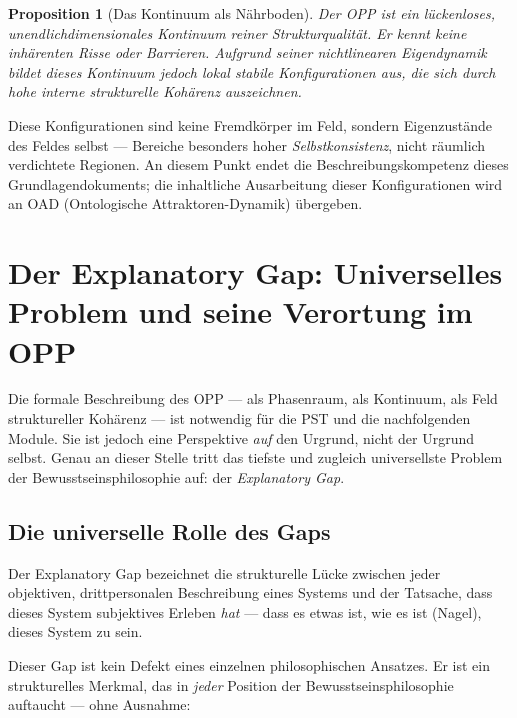 \documentclass[11pt,a4paper]{article}
\theoremstyle{plain}
\newtheorem{proposition}{Proposition}[section]
\theoremstyle{definition}
\begin{document}
\begin{proposition}[Das Kontinuum als N\"{a}hrboden]
Der OPP ist ein l\"{u}ckenloses, unendlichdimensionales Kontinuum reiner
Strukturqualit\"{a}t. Er kennt keine inh\"{a}renten Risse oder Barrieren. Aufgrund
seiner nichtlinearen Eigendynamik bildet dieses Kontinuum jedoch lokal stabile
Konfigurationen aus, die sich durch hohe interne \emph{strukturelle Koh\"{a}renz}
auszeichnen.
\end{proposition}

Diese Konfigurationen sind keine Fremdk\"{o}rper im Feld, sondern Eigenzust\"{a}nde des
Feldes selbst --- Bereiche besonders hoher \emph{Selbstkonsistenz}, nicht r\"{a}umlich
\glqq{}verdichtete\grqq{} Regionen. An diesem Punkt endet die Beschreibungskompetenz
dieses Grundlagendokuments; die inhaltliche Ausarbeitung dieser Konfigurationen wird an
OAD (Ontologische Attraktoren-Dynamik) \"{u}bergeben.

\section{Der Explanatory Gap: Universelles Problem und seine Verortung im OPP}

Die formale Beschreibung des OPP --- als Phasenraum, als Kontinuum, als Feld
struktureller Koh\"{a}renz --- ist notwendig f\"{u}r die PST und die nachfolgenden
Module. Sie ist jedoch eine Perspektive \emph{auf} den Urgrund, nicht der Urgrund
selbst. Genau an dieser Stelle tritt das tiefste und zugleich universellste Problem der
Bewusstseinsphilosophie auf: der \emph{Explanatory Gap}.

\subsection{Die universelle Rolle des Gaps}

Der Explanatory Gap bezeichnet die strukturelle L\"{u}cke zwischen jeder objektiven,
drittpersonalen Beschreibung eines Systems und der Tatsache, dass dieses System
subjektives Erleben \emph{hat} --- dass es \glqq{}etwas ist, wie es ist\grqq{} (Nagel),
dieses System zu sein.

Dieser Gap ist kein Defekt eines einzelnen philosophischen Ansatzes. Er ist ein
strukturelles Merkmal, das in \emph{jeder} Position der Bewusstseinsphilosophie
auftaucht --- ohne Ausnahme:
\end{document}
